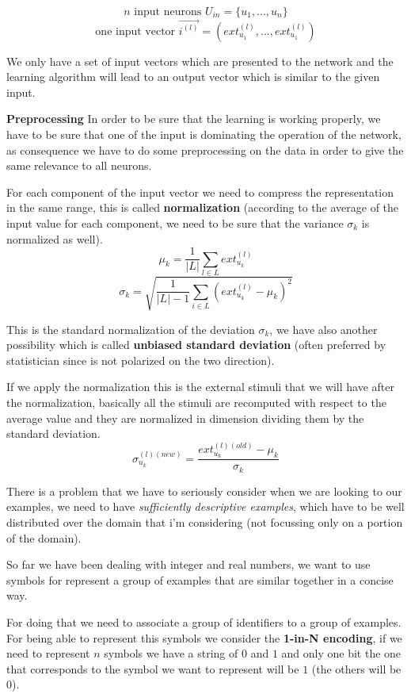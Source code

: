 \documentclass{article}
\begin{document}
$$n\text{ input neurons }U_{in}=\{u_1,...,u_n\}$$
$$\text{one input vector }\vec{i^{(l)}} = \left( ext_{u_1}^{(l)},...,ext_{u_1}^{(l)}\right)$$

We only have a set of input vectors which are presented to the network and the
learning algorithm will lead to an output vector which is similar to the given input.

\noindent\newline\textbf{Preprocessing}\newline
In order to be sure that the learning is working properly, we have to be sure
that one of the input is dominating the operation of the network, as consequence
we have to do some preprocessing on the data in order to give the same relevance
to all neurons.

For each component of the input vector we need to compress the representation
in the same range, this is called \textbf{normalization} (according to the
average of the input value for each component, we need to be sure that
the variance $\sigma_k$ is normalized as well).
$$\mu_k =\frac{1}{|L|}\sum_{l\in L}ext_{u_k}^{(l)}$$
$$\sigma_k =\sqrt{\frac{1}{|L|-1}\sum_{i\in L}\left(ext_{u_k}^{(l)}-\mu_k\right)^2}$$

This is the standard normalization of the deviation $\sigma_k$, we have also another
possibility which is called \textbf{unbiased standard deviation} (often preferred
by statistician since is not polarized on the two direction).

If we apply the normalization this is the external stimuli that we will have after
the normalization, basically all the stimuli are recomputed with respect to the
average value and they are normalized in dimension dividing them by the standard
deviation.
$$\sigma_{u_k}^{(l)(new)}=\frac{ext_{u_k}^{(l)(old)}-\mu_k}{\sigma_k}$$

There is a problem that we have to seriously consider when we are looking
to our examples, we need to have \textit{sufficiently descriptive examples},
which have to be well distributed over the domain that i'm considering (not
focussing only on a portion of the domain).

So far we have been dealing with integer and real numbers, we want to use
symbols for represent a group of examples that are similar together in a concise way.

For doing that we need to associate a group of identifiers to a group of examples. For
being able to represent this symbols we consider the \textbf{1-in-N encoding}, if
we need to represent $n$ symbols we have a string of $0$ and $1$ and only one bit the one
that corresponds to the symbol we want to represent will be $1$ (the others will be $0$).
\end{document}
